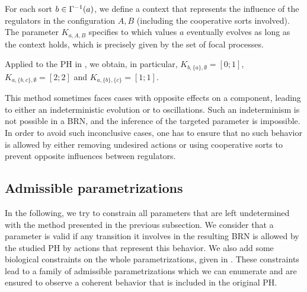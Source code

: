 For each sort $b \in \Gamma^{-1}(a)$, we define a context %
that represents the influence of the regulators in the configuration $A,B$ (including the cooperative sorts involved).
The parameter $K_{a,A,B}$ specifies to which values $a$ eventually evolves as long as the context
holds, which is precisely given by the set of focal processes. %

\begin{example*}
Applied to the PH in , we obtain, in particular,
$K_{b,\{a\},\emptyset} = [0 ; 1]$,
$K_{a,\{b,c\},\emptyset} = [2 ; 2]$ and
$K_{a,\{b\},\{c\}} = [1;1]$.
\end{example*}

This method sometimes faces cases with opposite effects on a component, leading to either an indeterministic evolution or to oscillations.
Such an indeterminism is not possible in a BRN, and the inference of the targeted parameter is impossible.
In order to avoid such inconclusive cases, one has to ensure that no such behavior is allowed
by either removing undesired actions or using cooperative sorts to prevent opposite influences between regulators.

\subsection{Admissible parametrizations}\label{ssec:admissible-K}

In the following, we try to constrain all parameters that are left undetermined with the method presented in the previous subsection.
We consider that a parameter is valid if any transition it involves in the resulting BRN is allowed by the studied PH by actions that represent this behavior.
We also add some biological constraints on the whole parametrizations, given in \cite{BernotSemBRN}.
These constraints lead to a family of admissible parametrizations which we can enumerate and are ensured to observe a coherent behavior that is included in the original PH.



